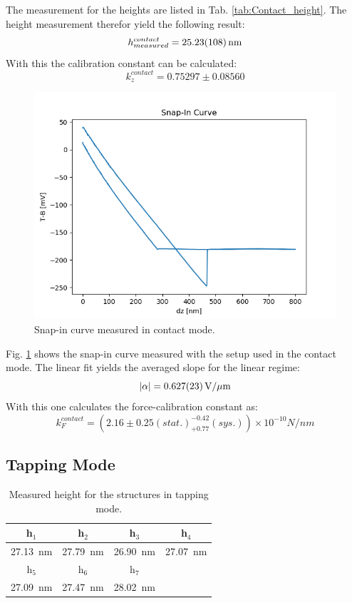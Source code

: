 \documentclass[%
 reprint,
amsmath,amssymb,
pra,
]{revtex4-1}
\begin{document}
The measurement for the heights are listed in Tab. \ref{tab:Contact_height}. The height measurement therefor yield the following result:
\begin{equation*}
h_{measured}^{contact} = \SI{25.23 \pm 1.08}{nm}
\end{equation*}
With this the calibration constant can be calculated:
\begin{equation*}
k_z^{contact} = 0.75297 \pm 0.08560
\end{equation*}

\begin{figure}
\centering
\includegraphics[scale=0.5]{Bilder/Contact_Mode/Snap_in_curve.PNG}
\caption{Snap-in curve measured in contact mode.}
\label{fig:Contact_snap_in}
\end{figure}

Fig. \ref{fig:Contact_snap_in} shows the snap-in curve measured with the setup used in the contact mode. The linear fit yields the averaged slope for the linear regime:
\begin{equation*}
|\alpha| = \SI{0.627 \pm 0.023}{V \per \mu m}
\end{equation*}
With this one calculates the force-calibration constant as:
\begin{equation*}
k_F^{contact} = (2.16 \pm 0.25 (stat.) _{+ 0.77} ^{- 0.42} (sys.)) \times 10^{-10} \si{N \per nm}
\end{equation*}


\subsection{Tapping Mode}
\begin{table}[h]
\centering
\begin{tabular}{|c|c|c|c|}
\hline 
h$_1$ & h$_2$ & h$_3$ & h$_4$ \\ 
\hline 
\SI{27.13}{nm} & \SI{27.79}{nm} & \SI{26.90}{nm} & \SI{27.07}{nm}  \\ 
\hline 
h$_5$ & h$_6$ & h$_7$ & \\ 
\hline 
\SI{27.09}{nm} & \SI{27.47}{nm} & \SI{28.02}{nm} &  \\ 
\hline 
\end{tabular} 
\caption{Measured height for the structures in tapping mode.}
\label{tab:Tapping_height}
\end{table}
\end{document}
